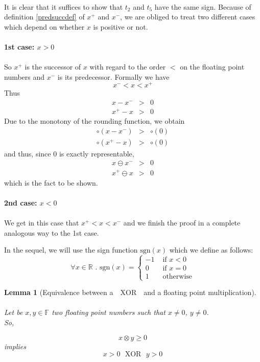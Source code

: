 \documentclass[a4paper,10pt,twoside]{article}
\newtheorem{lemma}[theorem]{Lemma}
\newenvironment{proof}[1][Proof]{\begin{trivlist}
\item[\hskip \labelsep {\bfseries #1}]}{\end{trivlist}}
\newcommand{\qed}{\nobreak \ifvmode \relax \else \ifdim \lastskip<1.5em \hskip-\lastskip
\hskip1.5em plus0em minus0.5em \fi \nobreak \vrule height0.75em width0.5em depth0.25em\fi}
\newcommand{\F}{\ensuremath{\mathbb {F}}}
\newcommand{\R}{\ensuremath{\mathbb {R}}}
\newcommand{\sgn}{\ensuremath{\mathrm{sgn}}}
\newcommand{\xor}{\ensuremath{\mbox{ }\mathrm{XOR}\mbox{ }}}
\begin{document}
\begin{proof} ~\\
It is clear that it suffices to show that $t_2$ and $t_5$ have the same sign. Because of definition \ref{predsuccdef} 
of $x^+$ and $x^-$, we are obliged to treat two different cases which depend on whether $x$ is positive or not.\\ ~ \\
{\bf 1st case: $x>0$} \\ ~ \\
So $x^+$ is the successor of $x$ with regard to the order $<$ on the floating point numbers and $x^-$ 
is its predecessor. Formally we have 
$$x^- < x < x^+$$
Thus
\begin{eqnarray*}
x - x^- & > & 0 \\
x^+ - x & > & 0 
\end{eqnarray*}
Due to the monotony of the rounding function, we obtain
\begin{eqnarray*}
\circ \left( x - x^- \right) & > & \circ \left( 0 \right) \\
\circ \left( x^+ - x \right) & > & \circ \left( 0 \right)
\end{eqnarray*}
and thus, since $0$ is exactly representable,
\begin{eqnarray*}
x \ominus x^- & > & 0 \\
x^+ \ominus x & > & 0 
\end{eqnarray*}
which is the fact to be shown. \\ ~ \\
{\bf 2nd case: $x<0$} \\ ~ \\
We get in this case that $x^+ < x < x^-$ and we finish the proof in a complete analogous way to the 1st case.\qed
\end{proof}
In the sequel, we will use the sign function $\sgn\left( x \right)$ which we define as follows:
$$\forall x \in \R\mbox{ . }\sgn\left( x \right) = \left \lbrace \begin{array}{cl} -1 & \mbox{ if } x < 0 \\
                                                                           0 & \mbox{ if } x = 0 \\
                                                                           1 & \mbox{ otherwise} \end{array} \right.$$
\begin{lemma}[Equivalence between a $\xor$ and a floating point multiplication] \label{equivxormult} ~ \\
Let be $x, y \in \F$ two floating point numbers such that $x \not = 0$, $y \not = 0$. \\
So, \vspace{-5mm}
\begin{center}
$$x \otimes y \geq 0$$
implies
$$x > 0 \xor y > 0$$
\end{center}
\end{lemma}
\end{document}

